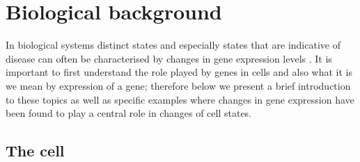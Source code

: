 \section{Biological background}
\label{sec:biol-backgr}

In biological systems distinct states and especially states that are indicative of disease can often be characterised by changes in gene expression levels \citep{DeRisi:1997dw,Spellman:1998wj,Eisen:1999uw, Brown:1999bk}. It is important to first understand the role played by genes in cells and also what it is we mean by expression of a gene; therefore below we present a brief introduction to these topics as well as specific examples where changes in gene expression have been found to play a central role in changes of cell states. 

\subsection{The cell}
\label{sec:cell}

